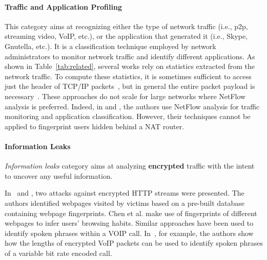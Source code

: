 \documentclass[10pt,conference,compsocconf,letterpaper]{IEEEtran}
\begin{document}
\paragraph{Traffic and Application Profiling}
This category aims at recognizing either the type
of network traffic (i.e., p2p, streaming video, VoIP, etc.), or the
application that generated it (i.e., Skype, Gnutella, etc.).
It is a classification technique employed by network
administrators to monitor network traffic and identify different
applications. As shown in Table~\ref{tab:related}, several works
rely on statistics extracted from the network traffic. 
To compute these statistics, it is sometimes sufficient to access just 
the header of TCP/IP packets~\cite{Zhang2011,Nguyen2012,Karagiannis2005,Stober2013}, but
in general the entire packet payload is necessary~\cite{Dai2013}.
These approaches do not scale for large networks where NetFlow analysis is 
preferred. Indeed, in  \cite{Barford:2001,Plonka:2000} and \cite{Rossi2010}, the authors use 
NetFlow analysis for traffic monitoring and application classification. However, their 
techniques cannot  be applied to fingerprint users hidden behind a NAT router. 

\paragraph{Information Leaks}
\emph{Information leaks} category aims at analyzing {\bf encrypted} traffic
with the intent to uncover any useful information.

In~\cite{Liberatore2006} and \cite{Sun2002}, two attacks against
encrypted HTTP streams were presented. The authors identified webpages visited 
by victims based on a pre-built database containing webpage
fingerprints. Chen et al.\cite{Chen2010} make use of fingerprints of
different webpages to infer users' browsing habits. 
Similar approaches have been used to identify spoken
phrases within a VOIP call. In~\cite{Wright2008}, for example, the
authors show how the lengths of encrypted VoIP packets can be used to
identify spoken phrases of a variable bit rate encoded call.
\end{document}
